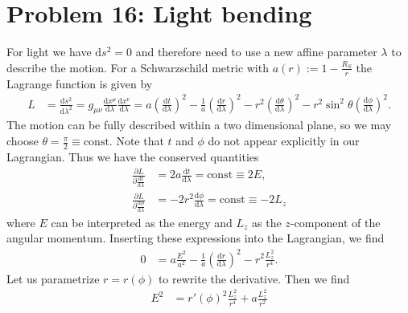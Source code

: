 \documentclass[english, parskip=full]{scrartcl}
\title{\titel}
\author{\autor}
\date{\today}
\newcommand{\kla}{}
\newcommand{\tecxt}{}
\begin{document}
\maketitle  %

\section*{Problem 16: Light bending}
For light we have $\tecxt\text{d}s^2=0$ and therefore need to use a new affine parameter $\lambda$ to describe the motion.
For a Schwarzschild metric with $a(r) := 1 - \frac{R_S}{r}$ the Lagrange function is given by
\begin{align}
L &= \frac{\tecxt\text{d}s^2}{\tecxt\text{d}\lambda^2} = g_{\mu\nu} \frac{\tecxt\text{d}x^\mu }{\tecxt\text{d}\lambda} \frac{\tecxt\text{d}x^\nu}{\tecxt\text{d}\lambda} = a \kla\left( \frac{\text{d}t }{\text{d}\lambda} \right)^2 - \frac{1}{a} \kla\left( \frac{\text{d}r }{\text{d}\lambda} \right)^2 - r^2 \kla\left( \frac{\text{d}\theta }{\text{d}\lambda} \right)^2 - r^2 \sin^2\theta \kla\left( \frac{\text{d}\phi }{\text{d}\lambda} \right)^2.
\end{align}
The motion can be fully described within a two dimensional plane, so we may choose $\theta = \frac{\pi}{2} \equiv \tecxt\text{const}$.
Note that $t$ and $\phi$ do not appear explicitly in our Lagrangian.
Thus we have the conserved quantities
\begin{align}
\frac{\partial L }{\partial \frac{\text{d}t }{\text{d}\lambda}} &= 2a \frac{\text{d}t }{\text{d}\lambda} = \tecxt\text{const} \equiv 2E,\\
\frac{\partial L }{\partial \frac{\text{d}\phi }{\text{d}\lambda}} &= -2r^2 \frac{\text{d}\phi }{\text{d}\lambda} = \tecxt\text{const} \equiv -2L_z
\end{align}
where $E$ can be interpreted as the energy and $L_z$ as the $z$-component of the angular momentum.
Inserting these expressions into the Lagrangian, we find
\begin{align}
0 &= a\frac{E^2}{a^2} - \frac{1}{a} \kla\left( \frac{\text{d}r }{\text{d}\lambda} \right)^2 - r^2 \frac{L_z^2}{r^4}.
\end{align}
Let us parametrize $r=r(\phi)$ to rewrite the derivative.
Then we find
\begin{align}
E^2 &= r'(\phi)^2 \frac{L_z^2}{r^4} + a \frac{L_z^2}{r^2}
\end{align}
\end{document}
